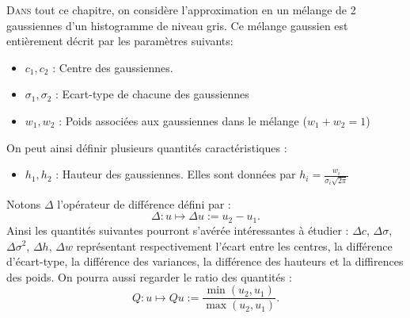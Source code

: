 \documentclass[main.tex]{subfiles}
\begin{document}
\renewcommand{\LettrineFontHook}{
\fontfamily{pag}
\fontseries{bx}\fontshape{it}
}
\lettrine[lines=2, lhang=0.33, loversize=0.25]{D}{ans} 
tout ce chapitre, on considère l'approximation en un mélange de 2 gaussiennes d'un histogramme de niveau gris. Ce mélange gaussien est entièrement décrit par les paramètres suivants:
\begin{itemize}
\item $c_1, c_2$ : Centre des gaussiennes.
\item $\sigma_1,\sigma_2$ : Ecart-type de chacune des gaussiennes
\item $w_1,w_2$ : Poids associées aux gaussiennes dans le mélange ($w_1+w_2=1$)
\end{itemize}
On peut ainsi définir plusieurs quantités caractéristiques :
\begin{itemize}
\item $h_1,h_2$ : Hauteur des gaussiennes. Elles sont données par $h_i = \frac{w_i}{\sigma_i\sqrt{2\pi}}$
\end{itemize}
Notons $\Delta$ l'opérateur de différence défini par :
\begin{equation}
\label{eq:operateur_delta_gaussienne}
\Delta :  u \longmapsto \Delta u := u_2 - u_1.
\end{equation}
Ainsi les quantités suivantes pourront s'avérée intéressantes à étudier : $\Delta c$, $\Delta \sigma$,  $\Delta \sigma^2$, $\Delta h$, $\Delta w$ représentant respectivement l'écart entre les centres, la différence d'écart-type, la différence des variances, la différence des hauteurs et la diffirences des poids. On pourra aussi regarder le ratio des quantités :
\begin{equation}
\label{eq:operateur_quotient_gaussienne}
Q :  u \longmapsto Qu := \dfrac{ \min( u_2 , u_1) }{ \max( u_2 , u_1)  }.
\end{equation}
\end{document}
